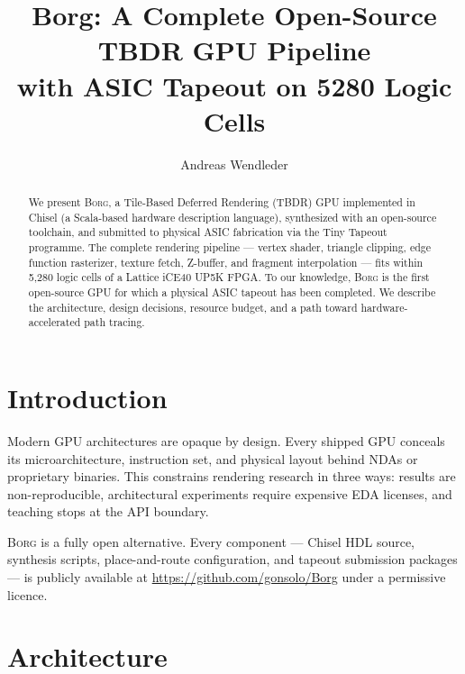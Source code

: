 \documentclass[sigconf,review,natbib=false]{acmart}
\begin{document}
\title{Borg: A Complete Open-Source TBDR GPU Pipeline\\
       with ASIC Tapeout on 5280 Logic Cells}

\author{Andreas Wendleder}

\begin{abstract}
We present \textsc{Borg}, a Tile-Based Deferred Rendering (TBDR) GPU
implemented in Chisel (a Scala-based hardware description language),
synthesized with an open-source toolchain, and submitted to physical
ASIC fabrication via the Tiny Tapeout programme.
The complete rendering pipeline — vertex shader, triangle clipping,
edge function rasterizer, texture fetch, Z-buffer, and fragment
interpolation — fits within 5{,}280 logic cells of a Lattice iCE40 UP5K FPGA.
To our knowledge, \textsc{Borg} is the first open-source GPU
for which a physical ASIC tapeout has been completed.
We describe the architecture, design decisions, resource budget,
and a path toward hardware-accelerated path tracing.
\end{abstract}

\maketitle

\section{Introduction}

Modern GPU architectures are opaque by design.
Every shipped GPU conceals its microarchitecture, instruction set,
and physical layout behind NDAs or proprietary binaries.
This constrains rendering research in three ways:
results are non-reproducible, architectural experiments require
expensive EDA licenses, and teaching stops at the API boundary.

\textsc{Borg} is a fully open alternative.
Every component — Chisel HDL source, synthesis scripts, place-and-route
configuration, and tapeout submission packages — is publicly available
at \url{https://github.com/gonsolo/Borg} under a permissive licence.

\section{Architecture}
\end{document}
